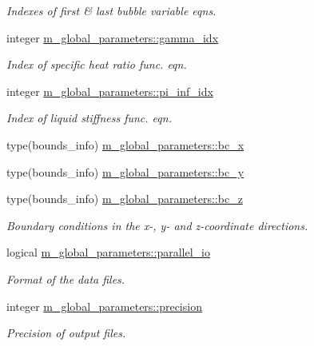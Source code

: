 \begin{DoxyCompactItemize}
\begin{DoxyCompactList}\small\item\em Indexes of first \& last bubble variable eqns. \end{DoxyCompactList}\item 
integer \hyperlink{namespacem__global__parameters_a4ecdedaf3db880f8d71dbefc816322f8}{m\+\_\+global\+\_\+parameters\+::gamma\+\_\+idx}
\begin{DoxyCompactList}\small\item\em Index of specific heat ratio func. eqn. \end{DoxyCompactList}\item 
integer \hyperlink{namespacem__global__parameters_a7db1a23566279bdbc7da68850c596c69}{m\+\_\+global\+\_\+parameters\+::pi\+\_\+inf\+\_\+idx}
\begin{DoxyCompactList}\small\item\em Index of liquid stiffness func. eqn. \end{DoxyCompactList}\item 
type(bounds\+\_\+info) \hyperlink{namespacem__global__parameters_aa46a7f3638e49fa9ec33ea859b9e6a5a}{m\+\_\+global\+\_\+parameters\+::bc\+\_\+x}
\item 
type(bounds\+\_\+info) \hyperlink{namespacem__global__parameters_a68eaaca2982b39252417b29ef5d0f9c3}{m\+\_\+global\+\_\+parameters\+::bc\+\_\+y}
\item 
type(bounds\+\_\+info) \hyperlink{namespacem__global__parameters_a6769808569174ff0eef096e958889837}{m\+\_\+global\+\_\+parameters\+::bc\+\_\+z}
\begin{DoxyCompactList}\small\item\em Boundary conditions in the x-\/, y-\/ and z-\/coordinate directions. \end{DoxyCompactList}\item 
logical \hyperlink{namespacem__global__parameters_ac127ac2a9036e1cdb7e6c41159cacdfb}{m\+\_\+global\+\_\+parameters\+::parallel\+\_\+io}
\begin{DoxyCompactList}\small\item\em Format of the data files. \end{DoxyCompactList}\item 
integer \hyperlink{namespacem__global__parameters_a6ed5e5561c16f30a4010f6612877029d}{m\+\_\+global\+\_\+parameters\+::precision}
\begin{DoxyCompactList}\small\item\em Precision of output files. \end{DoxyCompactList}\item 

\end{DoxyCompactItemize}
